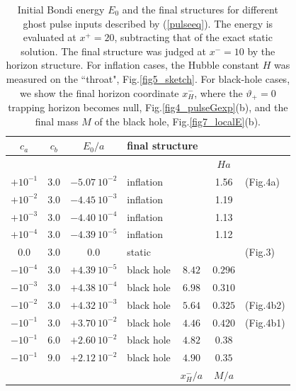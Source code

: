 
\begin{table}[htb]
\begin{tabular}{c|c|c|l cc l}
\hline
  $c_a$ &  $c_b$ &   $E_0/a$  & \multicolumn{4}{l}{ final structure}
\\
\hline
   &   &   & &&{$Ha$}&
\\
\hline $+ 10^{-1}$ & 3.0 & $- 5.07 ~ 10^{-2}$ & \multicolumn{2}{l}{inflation}
&1.56 & (Fig.4a)
\\
$+ 10^{-2}$  & 3.0 &  $- 4.45 ~ 10^{-3}$ & \multicolumn{2}{l}{inflation}&1.19 &
\\
$+ 10^{-3}$  & 3.0 &  $- 4.40 ~ 10^{-4}$ & \multicolumn{2}{l}{inflation}&1.13 &
\\
$+ 10^{-4}$  & 3.0 &  $- 4.39 ~ 10^{-5}$ & \multicolumn{2}{l}{inflation}&1.12 &
\\
\hline
$ 0.0$   & 3.0 &  0.0
& \multicolumn{3}{l}{static}    &  (Fig.3)
\\
\hline $- 10^{-4}$  & 3.0 &  $+ 4.39 ~ 10^{-5}$  & black hole  & $8.42$ &
$0.296$  &
\\
$- 10^{-3}$  & 3.0 &  $+ 4.38 ~ 10^{-4}$  & black hole  & $6.98$ & $0.310$  &
\\
$- 10^{-2}$  & 3.0 &  $+ 4.32 ~ 10^{-3}$  & black hole  & $5.64$ & $0.325$  &
(Fig.4b2)
\\
$- 10^{-1}$  & 3.0 &  $+ 3.70 ~ 10^{-2}$  & black hole  & $4.46$ & $0.420$ &
(Fig.4b1)
\\
$- 10^{-1}$  & 6.0 &  $+ 2.60 ~ 10^{-2}$  & black hole  & $4.82$ & $0.38$ &
\\
$- 10^{-1}$  & 9.0 &  $+ 2.12 ~ 10^{-2}$  & black hole  & $4.90$ & $0.35$ &
\\
\hline \multicolumn{4}{l}{}& $x^-_H/a$ & $M/a$ &
\\
\hline
\end{tabular}
\caption{Initial Bondi energy $E_0$ and the final structures for different
ghost pulse inputs described by (\ref{pulseeq}). The energy is evaluated at
$x^+=20$, subtracting that of the exact static solution. The final structure
was judged at $x^-=10$ by the horizon structure. For inflation cases, the
Hubble constant $H$ was measured on the ``throat", Fig.\ref{fig5_sketch}. For
black-hole cases, we show the final horizon coordinate $x^-_H$, where the
$\vartheta_+=0$ trapping horizon becomes null, Fig.\ref{fig4_pulseGexp}(b), and
the final mass $M$ of the black hole, Fig.\ref{fig7_localE}(b).
  }\label{table1}
\end{table}

